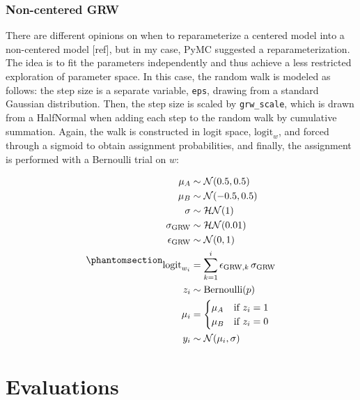 \documentclass[
  10pt,
  a4paper,
  openany]{scrbook}
\begin{document}
\subsubsection{Non-centered GRW}\label{non-centered-grw}

There are different opinions on when to reparameterize a centered model
into a non-centered model {[}ref{]}, but in my case, PyMC suggested a
reparameterization. The idea is to fit the parameters independently and
thus achieve a less restricted exploration of parameter space. In this
case, the random walk is modeled as follows: the step size is a separate
variable, \texttt{eps}, drawing from a standard Gaussian distribution.
Then, the step size is scaled by \texttt{grw\_scale}, which is drawn
from a HalfNormal when adding each step to the random walk by cumulative
summation. Again, the walk is constructed in logit space,
\(\mathrm{logit}_w\), and forced through a sigmoid to obtain assignment
probabilities, and finally, the assignment is performed with a Bernoulli
trial on \(w\):

\begin{equation}\phantomsection\label{eq-non-centered-grw}{
\begin{aligned}
\mu_A &\sim \mathcal{N}(0.5, 0.5) \\
\mu_B &\sim \mathcal{N}(-0.5, 0.5) \\
\sigma &\sim \mathcal{HN}(1) \\
\sigma_{\mathrm{GRW}} &\sim \mathcal{HN}(0.01)\\
\epsilon_{\mathrm{GRW}} &\sim \mathcal{N}(0, 1) \\
\mathrm{logit}_{w_i} &= \sum_{k=1}^i \epsilon_{\mathrm{GRW}, k} \, \sigma_{\mathrm{GRW}} \\ 
z_i &\sim \text{Bernoulli}(p) \\
\mu_i &= 
\begin{cases}
\mu_A & \text{if } z_i = 1 \\
\mu_B & \text{if } z_i = 0
\end{cases} \\
y_i &\sim \mathcal{N}(\mu_i, \sigma) \\
\end{aligned}
}\end{equation}

\section{Evaluations}\label{evaluations}
\end{document}
